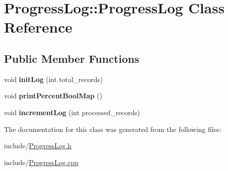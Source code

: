\hypertarget{classProgressLog_1_1ProgressLog}{}\section{Progress\+Log\+:\+:Progress\+Log Class Reference}
\label{classProgressLog_1_1ProgressLog}
\subsection*{Public Member Functions}
\begin{DoxyCompactItemize}
\item 
void {\bfseries init\+Log} (int total\+\_\+records)\hypertarget{classProgressLog_1_1ProgressLog_ad732b6692f94dd0990d3f108ceef4273}{}\label{classProgressLog_1_1ProgressLog_ad732b6692f94dd0990d3f108ceef4273}

\item 
void {\bfseries print\+Percent\+Bool\+Map} ()\hypertarget{classProgressLog_1_1ProgressLog_a4d12d8b1452f56b53faba6f55265862c}{}\label{classProgressLog_1_1ProgressLog_a4d12d8b1452f56b53faba6f55265862c}

\item 
void {\bfseries increment\+Log} (int processed\+\_\+records)\hypertarget{classProgressLog_1_1ProgressLog_a933daf485be1a3fbab4fde1fc8edbce0}{}\label{classProgressLog_1_1ProgressLog_a933daf485be1a3fbab4fde1fc8edbce0}

\end{DoxyCompactItemize}


The documentation for this class was generated from the following files\+:\begin{DoxyCompactItemize}
\item 
include/\hyperlink{ProgressLog_8h}{Progress\+Log.\+h}\item 
include/\hyperlink{ProgressLog_8cpp}{Progress\+Log.\+cpp}\end{DoxyCompactItemize}
